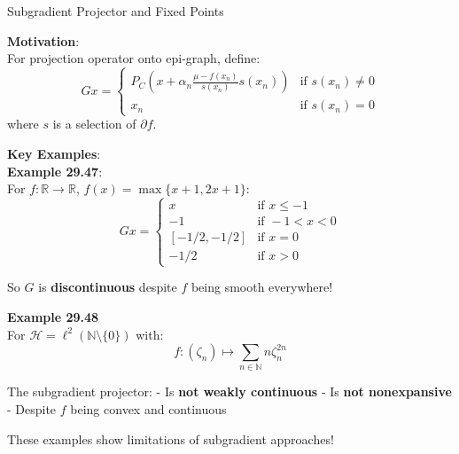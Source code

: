 \documentclass[aspectratio=169,10pt]{beamer}
\begin{document}
\begin{frame}[allowframebreaks]{Subgradient Projector and Fixed Points}

    \textbf{Motivation}:\\
    For projection operator onto epi-graph, define:
    $$G x = \begin{cases}
    P_C(x + \alpha_n \frac{\mu - f(x_n)}{s(x_n)} s(x_n)) & \text{if } s(x_n) \neq 0 \\
    x_n & \text{if } s(x_n) = 0
    \end{cases}$$
    where $s$ is a selection of $\partial f$.

    \vspace{0.5cm}

    \textbf{Key Examples}:\\

    \textbf{Example 29.47}:\\
    For $f: \mathbb{R} \to \mathbb{R}$, $f(x) = \max\{x+1, 2x+1\}$:
    $$G x = \begin{cases}
    x & \text{if } x \leq -1 \\
    -1 & \text{if } -1 < x < 0 \\
    [-1/2, -1/2] & \text{if } x = 0 \\
    -1/2 & \text{if } x > 0
    \end{cases}$$

    So $G$ is \textbf{discontinuous} despite $f$ being smooth everywhere!

    \framebreak

    \textbf{Example 29.48}\\
    For $\mathcal{H} = \ell^2(\mathbb{N} \setminus \{0\})$ with:
    $$f: (\zeta_n) \mapsto \sum_{n \in \mathbb{N}} n\zeta_n^{2n}$$

    The subgradient projector:
    - Is \textbf{not weakly continuous}
    - Is \textbf{not nonexpansive}
    - Despite $f$ being convex and continuous

    \vspace{0.5cm}

    These examples show limitations of subgradient approaches!

\end{frame}
\end{document}
